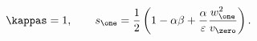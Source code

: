 \begin{equation}
\label{eq:s1}
\kappas=1, \qquad s_\one=\frac{1}{2}\left(1 - \alpha \beta +
\frac{\alpha}{\varepsilon} \frac{w_\one^2}{v_\zero} \right).
\end{equation}

